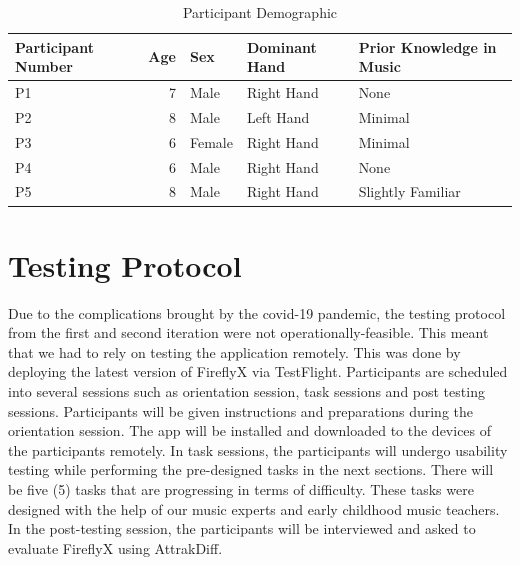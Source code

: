 

\begin{table}[]
\begin{tabular}{|l|r|l|l|l|}
\hline
Participant Number & \multicolumn{1}{l|}{Age} & Sex    & Dominant Hand & Prior Knowledge in Music \\ \hline
P1      & 7                        & Male   & Right Hand    & None                     \\ \hline
P2      & 8                        & Male   & Left Hand     & Minimal                  \\ \hline
P3      & 6                        & Female & Right Hand    & Minimal                  \\ \hline
P4      & 6                        & Male   & Right Hand     & None                     \\ \hline
P5      & 8                        & Male   & Right Hand    & Slightly Familiar        \\ \hline
\end{tabular}
\caption{Participant Demographic}
\label{tab:ParticipantDemographic}
\end{table}

\section{Testing Protocol}
Due to the complications brought by the covid-19 pandemic, the testing protocol from the first and second iteration were not operationally-feasible. This meant that we had to rely on testing the application remotely. This was done by deploying the latest version of FireflyX via TestFlight. Participants are scheduled into several sessions such as orientation session, task sessions and post testing sessions. Participants will be given instructions and preparations during the orientation session. The app will be installed and downloaded to the devices of the participants remotely. In task sessions, the participants will undergo usability testing while performing the pre-designed tasks in the next sections. There will be five (5) tasks that are progressing in terms of difficulty. These tasks were designed with the help of our music experts and early childhood music teachers. In the post-testing session, the participants will be interviewed and asked to evaluate FireflyX using AttrakDiff. 

